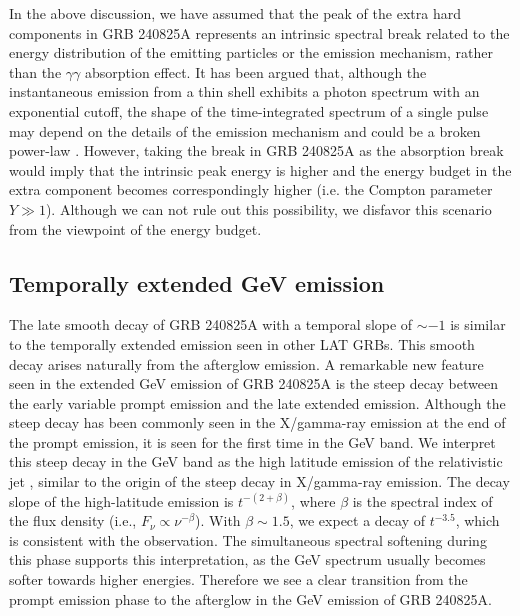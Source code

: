 \documentclass[twocolumn]{aastex631}
\begin{document}
In the above discussion, we have assumed that the peak of the extra hard components in GRB 240825A represents an intrinsic spectral break related to the energy distribution of the emitting particles or the
emission mechanism, rather than the $\gamma\gamma$ absorption effect. It has been argued that,  although the instantaneous emission from a thin shell exhibits a photon spectrum
with an exponential cutoff, the shape of the time-integrated
spectrum of a single pulse may depend on the details of
the emission mechanism and  could be a  broken power-law \citep{2008ApJ...677...92G}. However, taking the break in GRB 240825A as the absorption break would imply that the intrinsic peak energy is higher and the energy budget in the extra component becomes correspondingly higher (i.e. the Compton parameter $Y\gg 1$). Although we can not rule out this possibility, we disfavor this scenario from the viewpoint of the energy budget. 

\subsection{Temporally extended GeV emission}
The late smooth decay of GRB 240825A with a temporal slope of $\sim -1$ is similar to the temporally extended emission seen in other LAT GRBs. This smooth decay arises naturally from the afterglow emission. 
A remarkable new feature seen in the extended GeV emission of GRB 240825A is the steep  decay between the early variable prompt emission and the late extended emission. Although the steep decay has been commonly seen in the  X/gamma-ray emission at the end of the prompt emission, it is seen for the first time in the GeV band. We interpret this steep decay in the GeV band as the high latitude emission of the relativistic jet \citep{2000ApJ...541L...9K}, similar to the origin of the steep decay in X/gamma-ray emission. The decay slope of the high-latitude emission is $t^{-(2+\beta)}$, where $\beta$ is the spectral index of the flux density (i.e., $F_\nu\propto \nu^{-\beta}$). With $\beta\sim 1.5$, we expect a decay of $t^{-3.5}$, which is consistent with the observation.   The simultaneous spectral softening during this phase supports this interpretation, as the GeV spectrum usually becomes softer towards higher energies. Therefore we see a clear transition from the prompt emission phase to the afterglow  in the GeV emission of GRB 240825A. 
\end{document}
